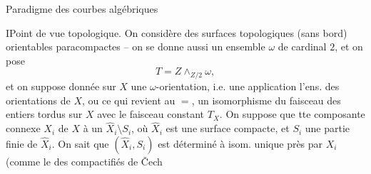 Paradigme des courbes algébriques

I\quad Point de vue topologique.
On considère des surfaces topologiques (sans bord)
orientables paracompactes  -- on se donne
 aussi un ensemble $\omega$ de cardinal $2$,
et on pose
\[T=Z\wedge_{Z/2}\omega,\]
et on suppose donnée sur $X$ une $\omega$-orientation,
i.e. une application
l'ens. des orientations de $X$, ou ce
qui revient au $=$, un isomorphisme
du faisceau des entiers tordus sur $X$
avec le faisceau constant $T_X$.
On suppose que tte composante connexe
$X_i$ de $X$   à un
$\widehat X_i\setminus S_i$, où $\widehat X_i$ est une surface
compacte, et $S_i$ une partie finie de
$\widehat X_i$. On sait que $(\widehat X_i,S_i)$ est déterminé
à isom. unique près par $X_i$
(comme le  des compactifiés de Čech
